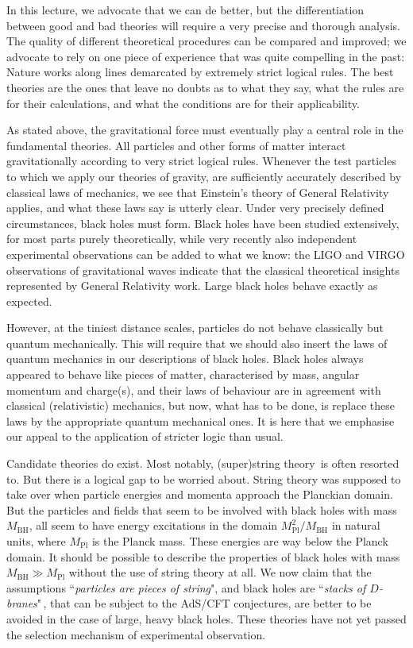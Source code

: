 \documentclass[12pt]{article}
\def\BH{{\mathrm{BH}}}\def\Pl{{\mathrm{Pl}}}\def\inn{{\mathrm{in}}} \def\outt{{\mathrm{out}}}
\begin{document}
In this lecture, we advocate that we can de better, but the differentiation between good and bad theories will require a very precise and thorough analysis. The quality of different theoretical procedures can be compared and improved; we advocate to rely on one piece of experience that was quite compelling in the past: Nature works along lines demarcated by extremely strict logical rules. The best theories are the ones that leave no doubts as to what they say, what the rules are for their calculations, and what the conditions are for their applicability.

As stated above, the gravitational force must eventually play a central role in the fundamental theories. All particles and other forms of matter interact gravitationally according to very strict logical rules. Whenever the test particles to which we apply our theories of gravity, are sufficiently accurately described by classical laws of mechanics, we see that Einstein's theory of General Relativity applies, and what these laws say is utterly clear. Under very precisely defined circumstances, black holes must form. Black holes have been studied extensively, for most parts purely theoretically, while very recently also independent experimental observations can be added to what we know: the LIGO and VIRGO observations of gravitational waves indicate that the classical theoretical insights represented by General Relativity work.  Large black holes behave exactly as expected.
  										
However, at the tiniest distance scales, particles do not behave classically but quantum mechanically. This will require that we should also insert the laws of quantum mechanics in our descriptions of black holes. Black holes always appeared to behave like pieces of matter, characterised by mass, angular momentum and charge(s), and their laws of behaviour are in agreement with classical (relativistic) mechanics, but now, what has to be done, is replace these laws by the appropriate quantum mechanical ones. It is here that we emphasise our appeal to the application of stricter logic than usual.							

Candidate theories do exist. Most notably, (super)string theory\,\cite{sustr} is often resorted to. But there is a logical gap to be worried about. String theory was supposed to take over when particle energies and momenta approach the Planckian domain.  But the particles and fields that seem to be involved with black holes with mass \(M_\BH\), all seem to have energy excitations in the domain \(M_\Pl^2/M_\BH\) in natural units, where \(M_\Pl\) is the Planck mass. These energies are way below the Planck domain. It should be possible to describe the properties of black holes with mass \(M_\BH\gg M_\Pl\) without the use of string theory at all. We now claim that the assumptions ``\emph{particles are pieces of string}", and black holes are ``\emph{stacks of \(D\)-branes}"\,\cite{Maldacena}, that can be subject to the AdS/CFT conjectures, are better to be avoided in the case of  large, heavy black holes. These theories have not yet passed the selection mechanism of experimental observation.
\end{document}
